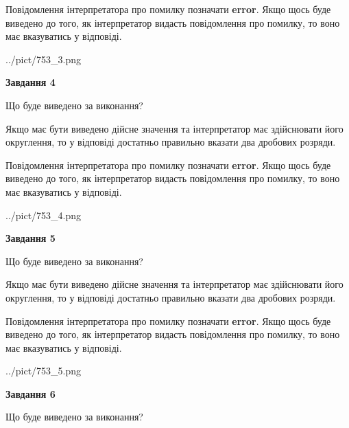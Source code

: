 \documentclass[12pt, ukrainian]{article}
\begin{document}
{\begin {Large}
Повідомлення інтерпретатора про помилку позначати \textbf{error}.
Якщо щось буде виведено до того, як інтерпретатор видасть повідомлення про помилку, 
то воно має вказуватись у відповіді. \par

\begin{center}
	{../pict/753_3.png}
\end{center}
\newpage

{\begin {center}\textbf{Завдання 4}\end {center}}\par
Що буде виведено за виконання? \par

Якщо має бути виведено дійсне значення та інтерпретатор має здійснювати його округлення, 
то у відповіді достатньо правильно вказати два дробових розряди.

Повідомлення інтерпретатора про помилку позначати \textbf{error}.
Якщо щось буде виведено до того, як інтерпретатор видасть повідомлення про помилку, 
то воно має вказуватись у відповіді. \par

\begin{center}
	{../pict/753_4.png}
\end{center}
\newpage

{\begin {center}\textbf{Завдання 5}\end {center}}\par
Що буде виведено за виконання? \par

Якщо має бути виведено дійсне значення та інтерпретатор має здійснювати його округлення, 
то у відповіді достатньо правильно вказати два дробових розряди.

Повідомлення інтерпретатора про помилку позначати \textbf{error}.
Якщо щось буде виведено до того, як інтерпретатор видасть повідомлення про помилку, 
то воно має вказуватись у відповіді. \par

\begin{center}
	{../pict/753_5.png}
\end{center}
\newpage

{\begin {center}\textbf{Завдання 6}\end {center}}\par
Що буде виведено за виконання? \par


\end{Large}}
\end{document}
